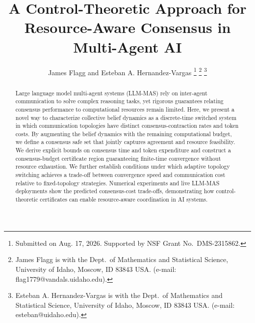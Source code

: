 \documentclass[journal,twoside,web]{ieeecolor_no_firstpage_logo}
\begin{document}
\title{A Control-Theoretic Approach for Resource-Aware Consensus in Multi-Agent AI}
\author{James Flagg and Esteban A. Hernandez-Vargas 
\thanks{Submitted on Aug. 17, 2026. Supported by NSF Grant No.\ DMS-2315862.}
\thanks{James Flagg is with the Dept.\ of Mathematics and Statistical Science, University of Idaho, Moscow, ID 83843 USA. (e-mail: flag1779@vandals.uidaho.edu). }
\thanks{Esteban A. Hernandez-Vargas is with the Dept.\ of Mathematics and Statistical Science, University of Idaho, Moscow, ID 83843 USA. (e-mail: esteban@uidaho.edu).}
}

\maketitle

\begin{abstract}
Large language model multi-agent systems (LLM-MAS) rely on inter-agent communication to solve complex reasoning tasks, yet rigorous guarantees relating consensus performance to computational resources remain limited. 
Here, we present a novel way to characterize collective belief dynamics as a discrete-time switched system in which communication topologies have distinct consensus-contraction rates and token costs. By augmenting the belief dynamics with the remaining computational budget, we define a consensus safe set that jointly captures agreement and resource feasibility. We derive explicit bounds on consensus time and token expenditure and construct a consensus-budget certificate region guaranteeing finite-time convergence without resource exhaustion. 
We further establish conditions under which adaptive topology switching achieves a trade-off between convergence speed and communication cost relative to fixed-topology strategies. Numerical experiments and live LLM-MAS deployments show the predicted consensus-cost trade-offs, demonstrating how control-theoretic certificates can enable resource-aware coordination in AI systems.
\end{abstract}
\end{document}
